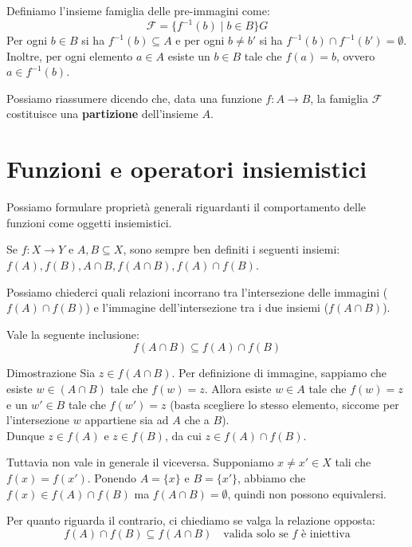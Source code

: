 \documentclass[12pt]{report}
\begin{document}
	Definiamo l'insieme famiglia delle pre-immagini come:
	\[
	\mathcal{F} = \{f^{-1}(b) \mid b \in B\}
	G\]
	Per ogni $b \in B$ si ha $f^{-1}(b) \subseteq A$ e per ogni $b \neq b'$ si ha $f^{-1}(b) \cap f^{-1}(b') = \emptyset$. Inoltre, per ogni elemento $a \in A$ esiste un $b \in B$ tale che $f(a) = b$, ovvero $a \in f^{-1}(b)$.
	
	Possiamo riassumere dicendo che, data una funzione $f: A \to B$, la famiglia $\mathcal{F}$ costituisce una \textbf{partizione} dell'insieme $A$.
	
	\section{Funzioni e operatori insiemistici}
	
	Possiamo formulare proprietà generali riguardanti il comportamento delle funzioni come oggetti insiemistici.
	
	Se $f: X \to Y$ e $A, B \subseteq X$, sono sempre ben definiti i seguenti insiemi: $f(A), f(B), A \cap B, f(A \cap B), f(A) \cap f(B)$.
	
	Possiamo chiederci quali relazioni incorrano tra l'intersezione delle immagini ($f(A) \cap f(B)$) e l'immagine dell'intersezione tra i due insiemi ($f(A \cap B)$).
	
	\begin{osservazione}{}{}
		Vale la seguente inclusione:
		\[
		f(A \cap B) \subseteq f(A) \cap f(B)
		\]
	\end{osservazione}
	
	\begin{dimostrazione}{Dimostrazione}{}
		Sia $z \in f(A \cap B)$. Per definizione di immagine, sappiamo che esiste $w \in (A \cap B)$ tale che $f(w) = z$. Allora esiste $w \in A$ tale che $f(w) = z$ e un $w' \in B$ tale che $f(w') = z$ (basta scegliere lo stesso elemento, siccome per l'intersezione $w$ appartiene sia ad $A$ che a $B$).\\
		Dunque $z \in f(A)$ e $z \in f(B)$, da cui $z \in f(A) \cap f(B)$.
	\end{dimostrazione}
	
	Tuttavia non vale in generale il viceversa. Supponiamo $x \neq x' \in X$ tali che $f(x) = f(x')$. Ponendo $A = \{x\}$ e $B = \{x'\}$, abbiamo che $f(x) \in f(A) \cap f(B)$ ma $f(A \cap B) = \emptyset$, quindi non possono equivalersi.
	
	Per quanto riguarda il contrario, ci chiediamo se valga la relazione opposta:
	\[
	f(A) \cap f(B) \subseteq f(A \cap B) \quad \text{valida solo se } f \text{ è iniettiva}
	\]
	
\end{document}
